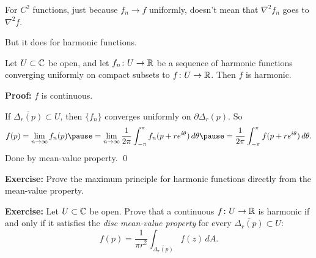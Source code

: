 \documentclass[10pt,aspectratio=169]{beamer}
\begin{document}
\begin{frame}
For $C^2$ functions, just because $f_n \to f$ uniformly,
doesn't mean that $\nabla^2 f_n$ goes to $\nabla^2 f$. 

\medskip
\pause

But it does for harmonic functions.

\pause
\begin{theorem}
Let $U \subset {\mathbb{C}}$ be open, and let $f_n \colon U \to {\mathbb{R}}$ be a sequence of
harmonic functions converging uniformly on compact subsets to $f \colon U
\to {\mathbb{R}}$.  Then $f$ is harmonic.
\end{theorem}

\pause
\textbf{Proof:}
\pause
$f$ is continuous.

\medskip
\pause

If $\overline{\Delta_r(p)} \subset U$,
then $\{ f_n \}$ converges uniformly on $\partial \Delta_r(p)$.  So
\pause
\begin{equation*}
f(p) =
\lim_{n\to\infty} f_n(p)
\pause
=
\lim_{n\to\infty} 
\frac{1}{2\pi} \int_{-\pi}^{\pi} f_n(p+re^{i\theta})\, d\theta
\pause
=
\frac{1}{2\pi} \int_{-\pi}^{\pi} f(p+re^{i\theta})\, d\theta .
\end{equation*}
\pause
Done by mean-value property. \qed
\end{frame}

\begin{frame}
\textbf{Exercise:}
Prove the maximum principle for harmonic functions directly from the
mean-value property.

\medskip
\pause

\textbf{Exercise:}
Let $U \subset {\mathbb{C}}$ be open.
Prove that a continuous $f \colon U \to {\mathbb{R}}$
is harmonic if and only if it satisfies the
\emph{disc mean-value property} for every $\overline{\Delta_r(p)}
\subset U$:
\[
f(p) = 
\frac{1}{\pi r^2} \int_{\overline{\Delta_r(p)}} f(z) \, dA.
\]

\end{frame}
\end{document}
